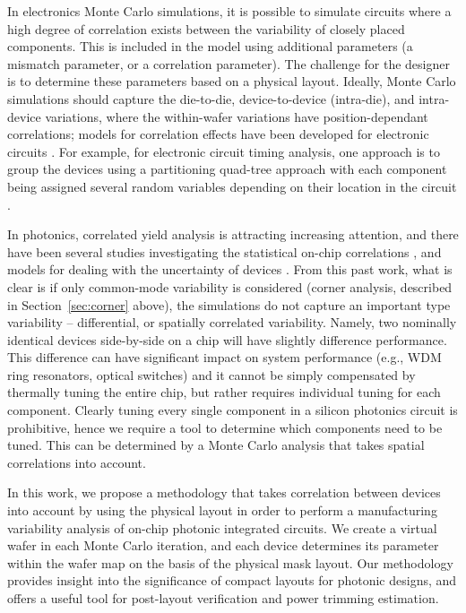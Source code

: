 \documentclass[journal]{spie}
\begin{document}
In electronics Monte Carlo simulations, it is possible to simulate circuits where a high degree of correlation exists between the variability of closely placed components.  This is included in the model using additional parameters (a mismatch parameter, or a correlation parameter).  The challenge for the designer is to determine these parameters based on a physical layout.
Ideally, Monte Carlo simulations should capture the die-to-die, device-to-device (intra-die), and intra-device variations, where the within-wafer variations have position-dependant correlations; models for correlation effects have been developed for electronic circuits \cite{agarwal2003statistical, liu2008spatial, cheng2011physically, zhang2013efficient, liao2015efficient}.  For example, for electronic circuit timing analysis, one approach is to group the devices using a partitioning quad-tree approach with each component being assigned several random variables depending on their location in the circuit  \cite{agarwal2003statistical}.  

In photonics, correlated yield analysis is attracting increasing attention, and there have been several studies investigating the statistical on-chip correlations \cite{lukas14:OFC,hochberg:wafer}, and models for dealing with the uncertainty of devices \cite{MIT:uncertainty}.  From this past work, what is clear is if only common-mode variability is considered (corner analysis,  described in Section~\ref{sec:corner} above), the simulations do not capture an important type variability -- differential, or spatially correlated variability.  Namely, two nominally identical devices side-by-side on a chip will have slightly difference performance.  This difference can have significant impact on system performance (e.g., WDM ring resonators, optical switches) and it cannot be simply compensated by thermally tuning the entire chip, but rather requires individual tuning for each component.  Clearly tuning every single component in a silicon photonics circuit is prohibitive, hence we require a tool to determine which components need to be tuned.  This can be determined by a Monte Carlo analysis that takes spatial correlations into account.

In this work, we propose a methodology that takes correlation between devices into account by using the physical layout in order to perform a manufacturing variability analysis of on-chip photonic integrated circuits.  We create a virtual wafer in each Monte Carlo iteration, and each device determines its parameter within the wafer map on the basis of the physical mask layout.
Our methodology  provides insight into the significance of compact layouts for photonic designs, and offers a useful tool for post-layout verification and power trimming estimation.
\end{document}
